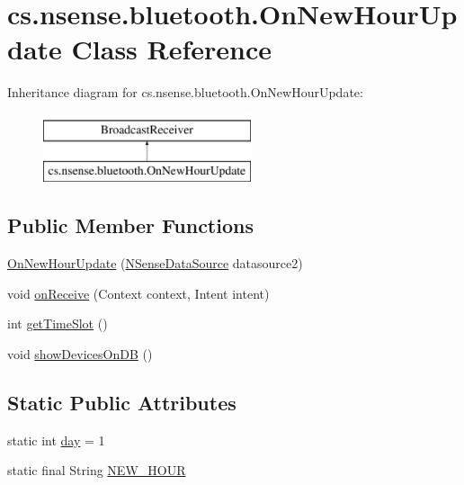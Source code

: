 \hypertarget{classcs_1_1nsense_1_1bluetooth_1_1_on_new_hour_update}{\section{cs.\-nsense.\-bluetooth.\-On\-New\-Hour\-Update Class Reference}
\label{classcs_1_1nsense_1_1bluetooth_1_1_on_new_hour_update}
}
Inheritance diagram for cs.\-nsense.\-bluetooth.\-On\-New\-Hour\-Update\-:\begin{figure}[H]
\begin{center}
\leavevmode
\includegraphics[height=2.000000cm]{classcs_1_1nsense_1_1bluetooth_1_1_on_new_hour_update}
\end{center}
\end{figure}
\subsection*{Public Member Functions}
\begin{DoxyCompactItemize}
\item 
\hyperlink{classcs_1_1nsense_1_1bluetooth_1_1_on_new_hour_update_a107d96179d966feecbb0a62569b37133}{On\-New\-Hour\-Update} (\hyperlink{classcs_1_1nsense_1_1db_1_1_n_sense_data_source}{N\-Sense\-Data\-Source} datasource2)
\item 
void \hyperlink{classcs_1_1nsense_1_1bluetooth_1_1_on_new_hour_update_a15d42d2c4c6fd1f049718aac22d6aebe}{on\-Receive} (Context context, Intent intent)
\item 
int \hyperlink{classcs_1_1nsense_1_1bluetooth_1_1_on_new_hour_update_a17c0a14eac8a98ce01724c5937e3116c}{get\-Time\-Slot} ()
\item 
void \hyperlink{classcs_1_1nsense_1_1bluetooth_1_1_on_new_hour_update_a3dddb1e9ce842744f37ac7aae2968633}{show\-Devices\-On\-D\-B} ()
\end{DoxyCompactItemize}
\subsection*{Static Public Attributes}
\begin{DoxyCompactItemize}
\item 
static int \hyperlink{classcs_1_1nsense_1_1bluetooth_1_1_on_new_hour_update_af48725ea7ecf9a8b98d4cf1e701990cd}{day} = 1
\item 
static final String \hyperlink{classcs_1_1nsense_1_1bluetooth_1_1_on_new_hour_update_a9a03ca7175289fcade7fba97599e1e97}{N\-E\-W\-\_\-\-H\-O\-U\-R}
\end{DoxyCompactItemize}
